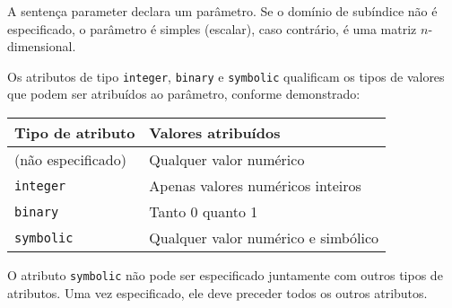 \documentclass[11pt, brazil]{report}
\begin{document}

A sentença parameter declara um parâmetro. Se o domínio de subíndice não
é especificado, o parâmetro é simples (escalar), caso contrário,
é uma matriz $n$-dimensional.

Os atributos de tipo {\tt integer}, {\tt binary} e {\tt symbolic}
qualificam os tipos de valores que podem ser atribuídos ao parâmetro, conforme
demonstrado:

%

\noindent\hfil
\begin{tabular}{@{}ll@{}}
Tipo de atributo&Valores atribuídos\\
\hline
(não especificado)&Qualquer valor numérico\\
{\tt integer}&Apenas valores numéricos inteiros\\
{\tt binary}&Tanto 0 quanto 1\\
{\tt symbolic}&Qualquer valor numérico e simbólico\\
\end{tabular}


O atributo {\tt symbolic} não pode ser especificado juntamente com outros tipos
de atributos. Uma vez especificado, ele deve preceder todos os outros atributos.
\end{document}
